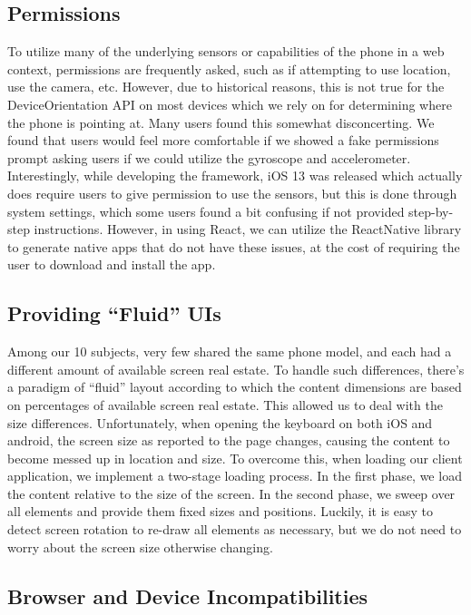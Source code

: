 \subsection{Permissions}

To utilize many of the underlying sensors or capabilities of the
phone in a web context, permissions are frequently asked, such
as if attempting to use location, use the camera, etc. However,
due to historical reasons, this is not true for the DeviceOrientation
API on most devices which we rely on for determining where the phone
is pointing at. Many users found this somewhat disconcerting. We
found that users would feel more comfortable if we showed a fake
permissions prompt asking users if we could utilize the gyroscope
and accelerometer. Interestingly, while developing the framework,
iOS 13 was released which actually does require users to give
permission to use the sensors, but this is done through system
settings, which some users found a bit confusing if not provided
step-by-step instructions. However, in using React, we can utilize the ReactNative library to generate native apps that do not have these issues, at the cost of requiring the user to download and install the app.

\subsection{Providing ``Fluid'' UIs}

Among our 10 subjects, very few shared the same phone model, and each had a different amount of
available screen real estate. To handle such differences,
there's a paradigm of ``fluid'' layout according to which the content dimensions are based on percentages of available screen real estate. This allowed
us to deal with the size differences. Unfortunately, when
opening the keyboard on both iOS and android, the screen size as
reported to the page changes, causing the content to become messed up
in location and size. To overcome this, when loading our client
application, we implement a two-stage loading process. In the
first phase, we load the content relative to the size of the screen.
In the second phase, we sweep over all elements and provide them
fixed sizes and positions. Luckily, it is easy to detect screen
rotation to re-draw all elements as necessary, but we do not need to
worry about the screen size otherwise changing.

\subsection{Browser and Device Incompatibilities}

